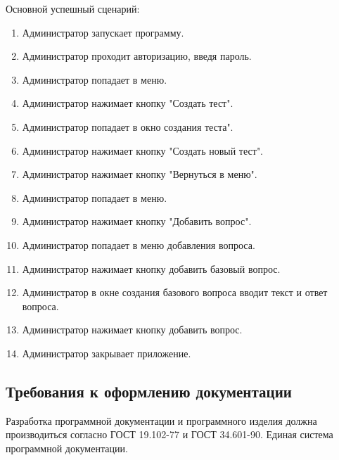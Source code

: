 Основной успешный сценарий:
\begin{enumerate}
	\item Администратор запускает программу.
	\item Администратор проходит авторизацию, введя пароль.
	\item Администратор попадает в меню.
	\item Администратор нажимает кнопку "Создать тест".
	\item Администратор попадает в окно создания теста".
	\item Администратор нажимает кнопку "Создать новый тест".
	\item Администратор нажимает кнопку "Вернуться в меню".
	\item Администратор попадает в меню.
	\item Администратор нажимает кнопку "Добавить вопрос".
	\item Администратор попадает в меню добавления вопроса.
	\item Администратор нажимает кнопку добавить базовый вопрос.
	\item Администратор в окне создания базового вопроса вводит текст и ответ вопроса.
	\item Администратор нажимает кнопку добавить вопрос.
	\item Администратор закрывает приложение.
\end{enumerate}

\subsection{Требования к оформлению документации}

Разработка программной документации и программного изделия должна производиться согласно ГОСТ 19.102-77 и ГОСТ 34.601-90. Единая система программной документации.
